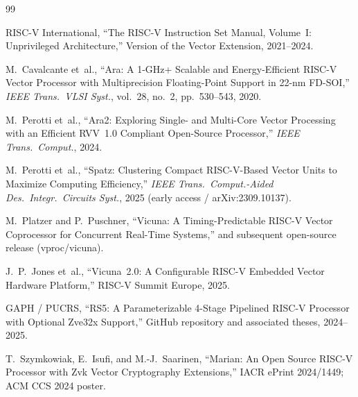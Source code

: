 \documentclass[11pt,a4paper]{article}
\begin{document}
\begin{thebibliography}{99}

RISC-V International,
``The RISC-V Instruction Set Manual, Volume~I: Unprivileged Architecture,''
Version of the Vector Extension, 2021--2024.

M.~Cavalcante et~al.,
``Ara: A 1-GHz+ Scalable and Energy-Efficient RISC-V Vector Processor with Multiprecision Floating-Point Support in 22-nm FD-SOI,''
\emph{IEEE Trans.\ VLSI Syst.}, vol.~28, no.~2, pp.~530--543, 2020.

M.~Perotti et~al.,
``Ara2: Exploring Single- and Multi-Core Vector Processing with an Efficient RVV~1.0 Compliant Open-Source Processor,''
\emph{IEEE Trans.\ Comput.}, 2024.

M.~Perotti et~al.,
``Spatz: Clustering Compact RISC-V-Based Vector Units to Maximize Computing Efficiency,''
\emph{IEEE Trans.\ Comput.-Aided Des.\ Integr.\ Circuits Syst.}, 2025 (early access / arXiv:2309.10137).

M.~Platzer and P.~Puschner,
``Vicuna: A Timing-Predictable RISC-V Vector Coprocessor for Concurrent Real-Time Systems,''
and subsequent open-source release (vproc/vicuna).

J.~P.~Jones et~al.,
``Vicuna~2.0: A Configurable RISC-V Embedded Vector Hardware Platform,''
RISC-V Summit Europe, 2025.

GAPH / PUCRS,
``RS5: A Parameterizable 4-Stage Pipelined RISC-V Processor with Optional Zve32x Support,''
GitHub repository and associated theses, 2024--2025.

T.~Szymkowiak, E.~Isufi, and M.-J.~Saarinen,
``Marian: An Open Source RISC-V Processor with Zvk Vector Cryptography Extensions,''
IACR ePrint 2024/1449; ACM CCS 2024 poster.

\end{thebibliography}
\end{document}
